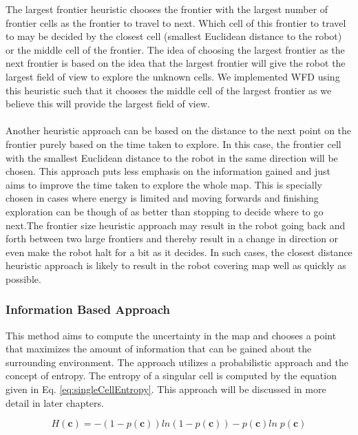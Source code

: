 \documentclass[a4paper,12pt]{article}
\begin{document}
				
					The largest frontier heuristic chooses the frontier with the largest number of frontier cells as the frontier to travel to next. Which cell of this frontier to travel to may be decided by the closest cell (smallest Euclidean distance to the robot) or the middle cell of the frontier. The idea of choosing the largest frontier as the next frontier is based on the idea that the largest frontier will give the robot the largest field of view to explore the unknown cells. We implemented WFD using this heuristic such that it chooses the middle cell of the largest frontier as we believe this will provide the largest field of view.
					\\
					\\
					Another heuristic approach can be based on the distance to the next point on the frontier purely based on the time taken to explore. In this case, the frontier cell with the smallest Euclidean distance to the robot in the same direction will be chosen. This approach puts less emphasis on the information gained and just aims to improve the time taken to explore the whole map. This is specially chosen in cases where energy is limited and moving forwards and finishing exploration can be though of as better than stopping to decide where to go next.The frontier size heuristic approach may result in the robot going back and forth between two large frontiers and thereby result in a change in direction or even make the robot halt for a bit as it decides. In such cases, the closest distance heuristic approach is likely to result in the robot covering map well as quickly as possible. 

				\subsubsection{Information Based Approach}

					This method aims to compute the uncertainty in the map and chooses a point that maximizes the amount of information that can be gained about the surrounding environment. The approach utilizes a probabilistic approach and the concept of entropy. The entropy of a singular cell is computed by the equation given in Eq. \ref{eq:singleCellEntropy}. This approach will be discussed in more detail in later chapters.

					\begin{equation}
						H \left(\textbf{c}\right) = -\left(1-p\left(\textbf{c}\right)\right)ln\left(1-p\left(\textbf{c}\right)\right) - p\left(\textbf{c}\right)ln \; p\left(\textbf{c}\right)
						\label{eq:singleCellEntropy}
					\end{equation}
					
\end{document}
